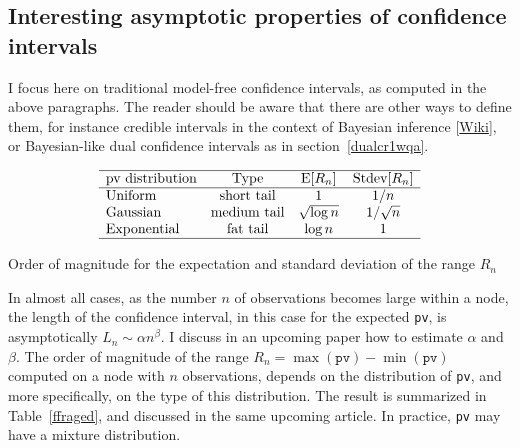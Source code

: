 \documentclass[oneside,10pt]{book}
\renewcommand{\arraystretch}{1.4} %
\begin{document}
\subsection{Interesting asymptotic properties of confidence intervals}

I focus here on traditional model-free confidence intervals, as computed in the above paragraphs. The reader should be aware that there are other ways to define them, for instance \textcolor{index}{credible intervals} in the context of
 \textcolor{index}{Bayesian inference} [\href{https://en.wikipedia.org/wiki/Bayesian_inference}{Wiki}], or 
 Bayesian-like \textcolor{index}{dual confidence intervals} as in section~\ref{dualcr1wqa}.


\renewcommand{\arraystretch}{1.2} %
\begin{center}
\begin{table}[H]
\[
\begin{array}{lccc}
\hline 
\text{pv distribution} & \text{Type} &  \text{E}[R_n] & \text{Stdev}[R_n] \\
\hline 
\text{Uniform} & \text{short tail} & 1 & 1/n \\
\text{Gaussian} & \text{medium tail} & \sqrt{\log n} & 1/\sqrt{n} \\
\text{Exponential} & \text{fat tail} & \log n & 1\\
\hline
\end{array}
\]
\caption{\label{ffraged}Order of magnitude for the expectation and standard deviation of the range $R_n$}
\end{table}
\end{center}

\renewcommand{\arraystretch}{1.0} %

In almost all cases, as the number $n$ of observations becomes large within a node, the length of the confidence interval, in this case for the expected \texttt{pv}, is asymptotically
 $L_n\sim\alpha n^\beta$. I discuss in an upcoming paper how to estimate $\alpha$ and $\beta$. The order of magnitude of the range $R_n =\max(\texttt{pv}) - \min(\texttt{pv})$
  computed on a node with $n$ observations, depends on the distribution of \texttt{pv}, and more specifically, on the type of this distribution. The result is summarized in Table~\ref{ffraged}, and discussed in the same upcoming article. In practice, \texttt{pv} may have a \textcolor{index}{mixture  distribution}.
\end{document}
